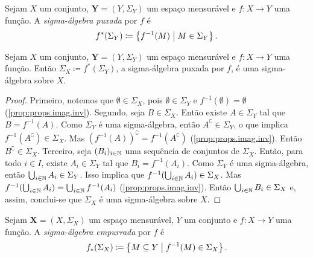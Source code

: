 \begin{defi}
Sejam $X$ um conjunto, $\bm Y = (Y,\Sigma_Y)$ um espaço mensurável e $f: X \to Y$ uma função. A \emph{sigma-álgebra puxada} por $f$ é
	\begin{equation*}
	f^*(\Sigma_Y) \coloneqq \set{f^{-1}(M)}{M \in \Sigma_Y}.
	\end{equation*}
\end{defi}

\begin{prop}
Sejam $X$ um conjunto, $\bm Y = (Y,\Sigma_Y)$ um espaço mensurável e $f: X \to Y$ uma função. Então $\Sigma_X \coloneqq f^*(\Sigma_Y)$, a sigma-álgebra puxada por $f$, é uma sigma-álgebra sobre $X$.
\end{prop}
\begin{proof}
Primeiro, notemos que $\emptyset \in \Sigma_X$, pois $\emptyset \in \Sigma_Y$ e $f^{-1}(\emptyset) = \emptyset$ (\ref{prop:props.imag.inv}). Segundo, seja $B \in \Sigma_X$. Então existe $A \in \Sigma_Y$ tal que $B = f^{-1}(A)$. Como $\Sigma_Y$ é uma sigma-álgebra, então $A^\complement \in \Sigma_Y$, o que implica $f^{-1}(A^\complement) \in \Sigma_X$. Mas $(f^{-1}(A))^\complement = f^{-1}(A^\complement)$ (\ref{prop:props.imag.inv}). Então $B^\complement \in \Sigma_X$. Terceiro, seja $(B_i)_{i \in \mathbb{N}}$ uma sequência de conjuntos de $\Sigma_X$. Então, para todo $i \in I$, existe $A_i \in \Sigma_Y$ tal que $B_i = f^{-1}(A_i)$. Como $\Sigma_Y$ é uma sigma-álgebra, então $\bigcup_{i \in \mathbb{N}} A_i \in \Sigma_Y$. Isso implica que $f^{-1}(\bigcup_{i \in \mathbb{N}} A_i) \in \Sigma_X$. Mas $f^{-1}(\bigcup_{i \in \mathbb{N}} A_i) = \bigcup_{i \in \mathbb{N}} f^{-1}(A_i)$ (\ref{prop:props.imag.inv}). Então $\bigcup_{i \in \mathbb{N}} B_i \in \Sigma_X$ e, assim, conclui-se que $\Sigma_X$ é uma sigma-álgebra sobre $X$.
\end{proof}

\begin{defi}
Sejam $\bm X = (X,\Sigma_X)$ um espaço mensurável, $Y$ um conjunto e $f: X \to Y$ uma função. A \emph{sigma-álgebra empurrada} por $f$ é
	\begin{equation*}
	f_*(\Sigma_X) \coloneqq \set{M \subseteq Y}{f^{-1}(M) \in \Sigma_X}.
	\end{equation*}
\end{defi}

